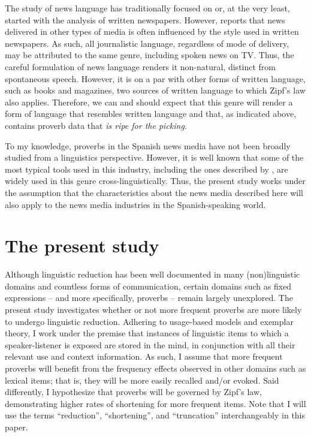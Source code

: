 \documentclass[output=paper,colorlinks,citecolor=brown,draftmode]{langscibook}
\begin{document}
The study of news language has traditionally focused on or, at the very least, started with the analysis of written newspapers. However, \citet{conboy2013language} reports that news delivered in other types of media is often influenced by the style used in written newspapers. As such, all journalistic language, regardless of mode of delivery, may be attributed to the same genre, including spoken news on TV. Thus, the careful formulation of news language renders it non-natural, distinct from spontaneous speech. However, it is on a par with other forms of written language, such as books and magazines, two sources of written language to which Zipf's law also applies. Therefore, we can and should expect that this genre will render a form of language that resembles written language and that, as indicated above, contains proverb data that \emph{is ripe for the picking}.

To my knowledge, proverbs in the Spanish news media have not been broadly studied from a linguistics perspective. However, it is well known that some of the most typical tools used in this industry, including the ones described by \citet{mouriquand1997ecriture}, are widely used in this genre cross-linguistically. Thus, the present study works under the assumption that the characteristics about the news media described here will also apply to the news media industries in the Spanish-speaking world.

\section{The present study}\label{sec:study}

Although linguistic reduction has been well documented in many (non)linguistic domains and countless forms of communication, certain domains such as fixed expressions -- and more specifically, proverbs -- remain largely unexplored. The present study investigates whether or not more frequent proverbs are more likely to undergo linguistic reduction. Adhering to usage-based models and exemplar theory, I work under the premise that instances of linguistic items to which a speaker-listener is exposed are stored in the mind, in conjunction with all their relevant use and context information. As such, I assume that more frequent proverbs will benefit from the frequency effects observed in other domains such as lexical items; that is, they will be more easily recalled and/or evoked. Said differently, I hypothesize that proverbs will be governed by Zipf’s law, demonstrating higher rates of shortening for more frequent items. Note that I will use the terms ``reduction'', ``shortening'', and ``truncation'' interchangeably in this paper.
\end{document}
